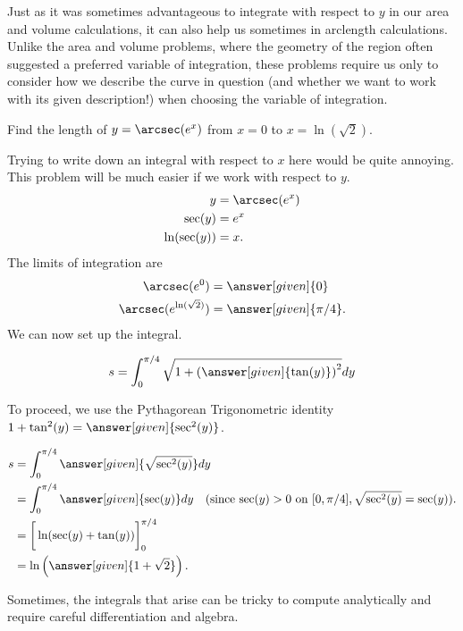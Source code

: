 \documentclass{ximera}
\begin{document}
Just as it was sometimes advantageous to integrate with respect to $y$ in our area and volume calculations, it can also help us sometimes in arclength calculations.  Unlike the area and volume problems, where the geometry of the region often suggested a preferred variable of integration, these problems require us only to consider how we describe the curve in question (and whether we want to work with its given description!) when choosing the variable of integration.
 
\begin{example}
  Find the length of $y = \arcsec(e^x)$ from $x= 0$ to  $x=\ln(\sqrt{2})$.
  \begin{explanation}
    Trying to write down an integral with respect to $x$ here would be quite annoying.  This problem will be much easier if we work with respect to $y$. 
    \begin{align*}
      y &= \arcsec(e^x)\\
      \sec(y) &= e^x\\
      \ln(\sec(y)) &= x.
    \end{align*}
    The limits of integration are
    \begin{align*}
      \arcsec(e^0) &= \answer[given]{0}\\
      \arcsec(e^{\ln(\sqrt{2})}) &= \answer[given]{\pi/4} .
    \end{align*}
We can now set up the integral.

\[ 
s = \int_0^{\pi/4} \sqrt{1+\left( \answer[given]{\tan(y)} \right)^2} dy\\      
      \]

To proceed, we use the Pythagorean Trigonometric identity $1+\tan^2(y) = \answer[given]{\sec^2(y)}$.

    \begin{align*}
     s  &=\int_0^{\pi/4} \answer[given]{\sqrt{\sec^2(y)}} dy\\
      &=\int_0^{\pi/4} \answer[given]{\sec(y)} dy \quad (\textrm{since $\sec(y)>0$  on } [0, \pi/4], \sqrt{\sec^2(y)} = \sec(y)). \\
      &=\bigg[\ln(\sec(y)+\tan(y))\bigg]_0^{\pi/4}\\
      &=\ln \left(\answer[given]{1+\sqrt{2}} \right).
    \end{align*}
  \end{explanation}
\end{example}

Sometimes, the integrals that arise can be tricky to compute analytically and require careful differentiation and algebra.
\end{document}
